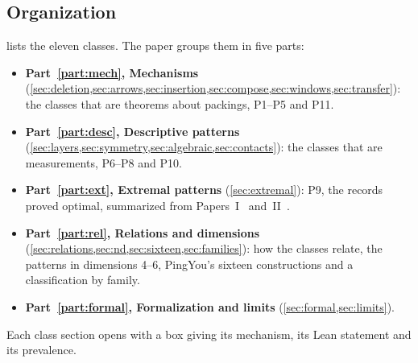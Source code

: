 \documentclass[11pt,a4paper]{article}
\begin{document}
\subsection{Organization}
 lists the eleven classes. The paper groups them in five parts:
\begin{itemize}
\item \textbf{Part~\ref{part:mech}, Mechanisms} (\cref{sec:deletion,sec:arrows,sec:insertion,sec:compose,sec:windows,sec:transfer}): the classes that are theorems about packings, P1--P5 and P11.
\item \textbf{Part~\ref{part:desc}, Descriptive patterns} (\cref{sec:layers,sec:symmetry,sec:algebraic,sec:contacts}): the classes that are measurements, P6--P8 and P10.
\item \textbf{Part~\ref{part:ext}, Extremal patterns} (\cref{sec:extremal}): P9, the records proved optimal, summarized from Papers~I~\cite{cubecentre} and~II~\cite{widthball}.
\item \textbf{Part~\ref{part:rel}, Relations and dimensions} (\cref{sec:relations,sec:nd,sec:sixteen,sec:families}): how the classes relate, the patterns in dimensions 4--6, PingYou's sixteen constructions and a classification by family.
\item \textbf{Part~\ref{part:formal}, Formalization and limits} (\cref{sec:formal,sec:limits}).
\end{itemize}
Each class section opens with a box giving its mechanism, its Lean statement and its prevalence.
\end{document}
